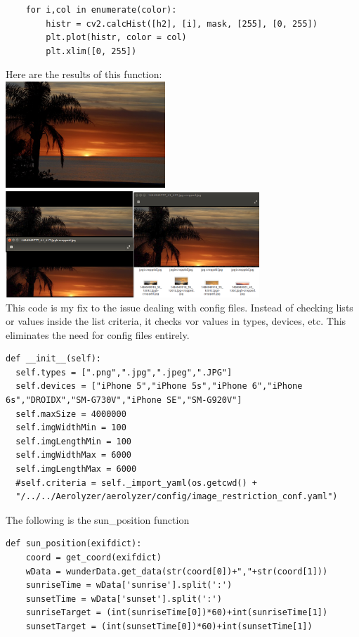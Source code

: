 \documentclass[onecolumn, draftclsnofoot,10pt, compsoc]{IEEEtran}
\begin{document}
\begin{singlespace}
\begin{lstlisting}
	for i,col in enumerate(color):
		histr = cv2.calcHist([h2], [i], mask, [255], [0, 255])
		plt.plot(histr, color = col)
		plt.xlim([0, 255])
			\end{lstlisting}
			\cite{neural}
			Here are the results of this function:\\
			\includegraphics[height=4cm,natwidth=640,natheight=426]{images/horizon_uncropped.jpg}\\
			\includegraphics[height=4cm,natwidth=1281,natheight=537]{images/horizon_cropped.png}\\
			
			This code is my fix to the issue dealing with config files. 
			Instead of checking lists or values inside the list criteria, it checks vor values in types, devices, etc.
			This eliminates the need for config files entirely.
			\begin{lstlisting}
def __init__(self):
  self.types = [".png",".jpg",".jpeg",".JPG"]
  self.devices = ["iPhone 5","iPhone 5s","iPhone 6","iPhone 6s","DROIDX","SM-G730V","iPhone SE","SM-G920V"]
  self.maxSize = 4000000
  self.imgWidthMin = 100
  self.imgLengthMin = 100
  self.imgWidthMax = 6000
  self.imgLengthMax = 6000
  #self.criteria = self._import_yaml(os.getcwd() + 
  "/../../Aerolyzer/aerolyzer/config/image_restriction_conf.yaml")
			\end{lstlisting}

			The following is the sun\_position function
			\begin{lstlisting}
def sun_position(exifdict):
	coord = get_coord(exifdict)
	wData = wunderData.get_data(str(coord[0])+","+str(coord[1]))
	sunriseTime = wData['sunrise'].split(':')
	sunsetTime = wData['sunset'].split(':')
	sunriseTarget = (int(sunriseTime[0])*60)+int(sunriseTime[1])
	sunsetTarget = (int(sunsetTime[0])*60)+int(sunsetTime[1])


\end{lstlisting}
\end{singlespace}
\end{document}
